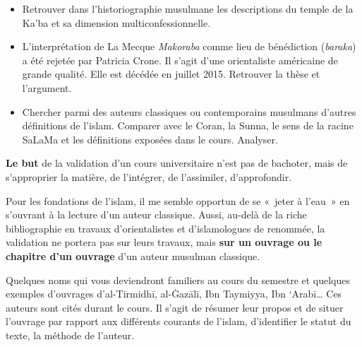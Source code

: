 
\begin{itemize}
\item
  Retrouver dans l'historiographie musulmane les descriptions du temple
  de la Ka'ba et sa dimension multiconfessionnelle.
\item
  L'interprétation de La Mecque \emph{Makoraba} comme lieu de
  bénédiction (\emph{baraka}) a été rejetée par Patricia Crone. Il
  s'agit d'une orientaliste américaine de grande qualité. Elle est
  décédée en juillet 2015. Retrouver la thèse et l'argument.
\item
  Chercher parmi des auteurs classiques ou contemporains musulmans
  d'autres définitions de l'islam. Comparer avec le Coran, la Sunna, le
  sens de la racine SaLaMa et les définitions exposées dans le cours.
  Analyser.
\end{itemize}



\textbf{Le but} de la validation d'un cours universitaire n'est pas de
bachoter, mais de s'approprier la matière, de l'intégrer, de
l'assimiler, d'approfondir.

Pour les fondations de l'islam, il me semble opportun de se «~jeter à
l'eau~» en s'ouvrant à la lecture d'un auteur classique. Aussi, au-delà
de la riche bibliographie en travaux d'orientalistes et d'islamologues
de renommée, la validation ne portera pas sur leurs travaux, mais
\textbf{sur un ouvrage ou le chapitre d'un ouvrage} d'un auteur musulman
classique.

Quelques noms qui vous deviendront familiers au cours du semestre et
quelques exemples d'ouvrages d'al-Tirmidhī, al-Ġazālī, Ibn Taymiyya, Ibn
`Arabī\ldots{} Ces auteurs sont cités durant le cours. Il s'agit de
résumer leur propos et de situer l'ouvrage par rapport aux différents
courants de l'islam, d'identifier le statut du texte, la méthode de
l'auteur.

